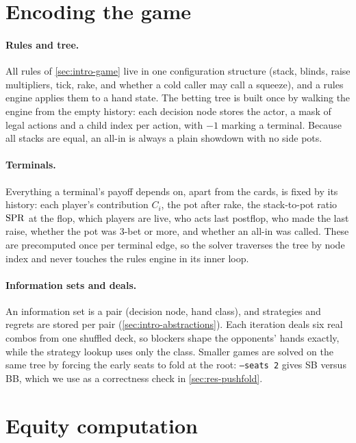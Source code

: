 \section{Encoding the game}\label{sec:encoding}

\paragraph{Rules and tree.} All rules of \cref{sec:intro-game} live in one configuration structure (stack, blinds, raise multipliers, tick, rake, and whether a cold caller may call a squeeze), and a rules engine applies them to a hand state. The betting tree is built once by walking the engine from the empty history: each decision node stores the actor, a mask of legal actions and a child index per action, with $-1$ marking a terminal. Because all stacks are equal, an all-in is always a plain showdown with no side pots.

\paragraph{Terminals.} Everything a terminal's payoff depends on, apart from the cards, is fixed by its history: each player's contribution $C_i$, the pot after rake, the stack-to-pot ratio $\mathrm{SPR}$ at the flop, which players are live, who acts last postflop, who made the last raise, whether the pot was 3-bet or more, and whether an all-in was called. These are precomputed once per terminal edge, so the solver traverses the tree by node index and never touches the rules engine in its inner loop.

\paragraph{Information sets and deals.} An information set is a pair (decision node, hand class), and strategies and regrets are stored per pair (\cref{sec:intro-abstractions}). Each iteration deals six real combos from one shuffled deck, so blockers shape the opponents' hands exactly, while the strategy lookup uses only the class. Smaller games are solved on the same tree by forcing the early seats to fold at the root: \texttt{--seats 2} gives SB versus BB, which we use as a correctness check in \cref{sec:res-pushfold}.

\section{Equity computation}\label{sec:equity-impl}


